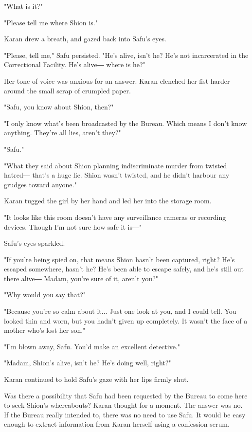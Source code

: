 "What is it?"

"Please tell me where Shion is."

Karan drew a breath, and gazed back into Safu's eyes.

"Please, tell me," Safu persisted. "He's alive, isn't he? He's not
incarcerated in the Correctional Facility. He's alive― where is he?"

Her tone of voice was anxious for an answer. Karan clenched her fist
harder around the small scrap of crumpled paper.

"Safu, you know about Shion, then?"

"I only know what's been broadcasted by the Bureau. Which means I don't
know anything. They're all lies, aren't they?"

"Safu."

"What they said about Shion planning indiscriminate murder from twisted
hatred― that's a huge lie. Shion wasn't twisted, and he didn't harbour
any grudges toward anyone."

Karan tugged the girl by her hand and led her into the storage room.

"It looks like this room doesn't have any surveillance cameras or
recording devices. Though I'm not sure how safe it is―"

Safu's eyes sparkled.

"If you're being spied on, that means Shion hasn't been captured, right?
He's escaped somewhere, hasn't he? He's been able to escape safely, and
he's still out there alive― Madam, you're sure of it, aren't you?"

"Why would you say that?"

"Because you're so calm about it... Just one look at you, and I could
tell. You looked thin and worn, but you hadn't given up completely. It
wasn't the face of a mother who's lost her son."

"I'm blown away, Safu. You'd make an excellent detective."

"Madam, Shion's alive, isn't he? He's doing well, right?"

Karan continued to hold Safu's gaze with her lips firmly shut.

Was there a possibility that Safu had been requested by the Bureau to
come here to seek Shion's whereabouts? Karan thought for a moment. The
answer was no. If the Bureau really intended to, there was no need to
use Safu. It would be easy enough to extract information from Karan
herself using a confession serum.

